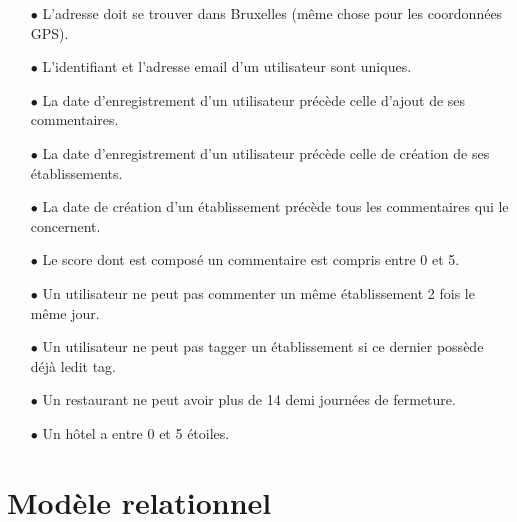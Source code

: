 \documentclass[a4paper, 11pt]{article}
\begin{document}
\begin{itemize}
	\item[$\bullet$] L'adresse doit se trouver dans Bruxelles (même chose pour les coordonnées GPS).
	\item[$\bullet$] L'identifiant et l'adresse email d'un utilisateur sont uniques.
	\item[$\bullet$] La date d'enregistrement d'un utilisateur précède celle d'ajout de ses commentaires. 
	\item[$\bullet$] La date d'enregistrement d'un utilisateur précède celle de création de ses établissements.
	\item[$\bullet$] La date de création d'un établissement précède tous les commentaires qui le concernent.
	\item[$\bullet$] Le score dont est composé un commentaire est compris entre 0 et 5.
	\item[$\bullet$] Un utilisateur ne peut pas commenter un même établissement 2 fois le même jour.
	\item[$\bullet$] Un utilisateur ne peut pas tagger un établissement si ce dernier possède déjà ledit tag.
	\item[$\bullet$] Un restaurant ne peut avoir plus de 14 demi journées de fermeture.
	\item[$\bullet$] Un hôtel a entre 0 et 5 étoiles.
\end{itemize}

\section{Modèle relationnel}
\end{document}
